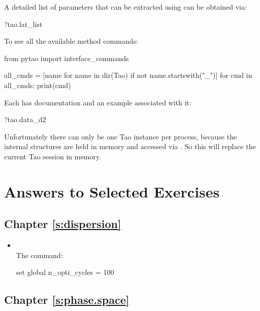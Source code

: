 \documentclass{hitec}     %
\begin{document}
{{{{A detailed list of parameters that can be extracted using  can be obtained via:
\begin{code}
?tao.lat_list
\end{code}

To see all the available method commands:
\begin{code}
from pytao import interface_commands

all_cmds = [name for name in dir(Tao) if not name.startswith("_")]
for cmd in all_cmds:
    print(cmd)
\end{code}

Each has documentation and an example associated with it:
\begin{code}
?tao.data_d2
\end{code}

Unfortunately there can only be one Tao instance per process, because the internal structures are held in memory and accessed via . So this will replace the current Tao session in memory.

\section{Answers to Selected Exercises}

\subsection{Chapter \ref{s:dispersion}}   %

\begin{itemize}[leftmargin=*]
%
\item[]\hspace*{-24pt} \\
The  command:
\begin{code}
set global n_opti_cycles = 100
\end{code}
\end{itemize}

\subsection{Chapter \ref{s:phase.space}}   %

}}}}
\end{document}
